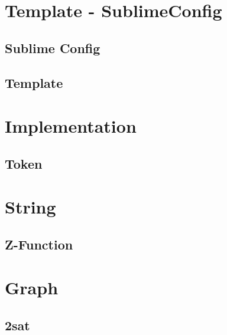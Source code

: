 \hrulefill
\section{Template - SublimeConfig}
\subsection{Sublime Config}
\raggedbottom
\subsection{Template}
\raggedbottom
\hrulefill

\section{Implementation}
\subsection{Token}
\raggedbottom
\hrulefill


\section{String}
\subsection{Z-Function}
\raggedbottom
\hrulefill



\section{Graph}
\subsection{2sat}
\raggedbottom
\hrulefill

